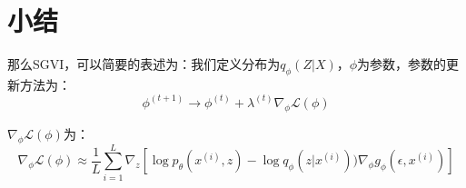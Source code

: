 \documentclass[a4paper]{article}
\begin{document}
\section{小结}
那么SGVI，可以简要的表述为：我们定义分布为$q_{\phi}(Z|X)$，$\phi$为参数，参数的更新方法为：
\begin{equation}
    \phi^{(t+1)} \longrightarrow \phi^{(t)} + \lambda^{(t)}\nabla_{\phi} \mathcal{L}(\phi)
\end{equation}

$\nabla_{\phi} \mathcal{L}(\phi)$为：
\begin{equation}
    \nabla_{\phi} \mathcal{L}(\phi) \approx \frac{1}{L} \sum_{i=1}^L
    \nabla_{z} \left[ \log p_{\theta}(x^{(i)},z) - \log q_{\phi}(z|x^{(i)}))\nabla_{\phi}g_{\phi}(\epsilon, x^{(i)}) \right]
\end{equation}
\end{document}
